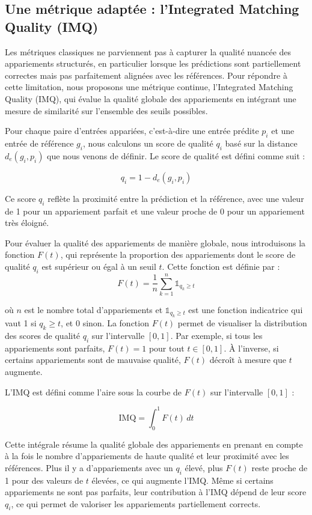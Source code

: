 \subsection{Une métrique adaptée : l'Integrated Matching Quality (IMQ)}

Les métriques classiques ne parviennent pas à capturer la qualité nuancée des appariements structurés, en particulier lorsque les prédictions sont partiellement correctes mais pas parfaitement alignées avec les références. Pour répondre à cette limitation, nous proposons une métrique continue, l'Integrated Matching Quality (IMQ), qui évalue la qualité globale des appariements en intégrant une mesure de similarité sur l'ensemble des seuils possibles.

Pour chaque paire d'entrées appariées, c'est-à-dire une entrée prédite $p_i$ et une entrée de référence $g_i$, nous calculons un score de qualité $q_i$ basé sur la distance $d_e(g_i, p_i)$ que nous venons de définir. Le score de qualité est défini comme suit :

$$q_i = 1 - d_e(g_i, p_i)$$

Ce score $q_i$ reflète la proximité entre la prédiction et la référence, avec une valeur de 1 pour un appariement parfait et une valeur proche de 0 pour un appariement très éloigné.

Pour évaluer la qualité des appariements de manière globale, nous introduisons la fonction $F(t)$, qui représente la proportion des appariements dont le score de qualité $q_i$ est supérieur ou égal à un seuil $t$. Cette fonction est définie par :
$$F(t) = \frac{1}{n} \sum_{k=1}^{n} \mathbb{1}_{q_k \geq t}$$

où $n$ est le nombre total d'appariements et $\mathbb{1}_{q_k \geq t}$ est une fonction indicatrice qui vaut 1 si $q_k \geq t$, et 0 sinon. La fonction $F(t)$ permet de visualiser la distribution des scores de qualité $q_i$ sur l'intervalle $[0, 1]$. Par exemple, si tous les appariements sont parfaits, $F(t) = 1$ pour tout $t \in [0, 1]$. À l'inverse, si certains appariements sont de mauvaise qualité, $F(t)$ décroît à mesure que $t$ augmente.

L'IMQ est défini comme l'aire sous la courbe de $F(t)$ sur l'intervalle $[0, 1]$ :

$$\text{IMQ} = \int_0^1 F(t) \, dt$$

Cette intégrale résume la qualité globale des appariements en prenant en compte à la fois le nombre d'appariements de haute qualité et leur proximité avec les références. Plus il y a d'appariements avec un $q_i$ élevé, plus $F(t)$ reste proche de 1 pour des valeurs de $t$ élevées, ce qui augmente l'IMQ. Même si certains appariements ne sont pas parfaits, leur contribution à l'IMQ dépend de leur score $q_i$, ce qui permet de valoriser les appariements partiellement corrects.

